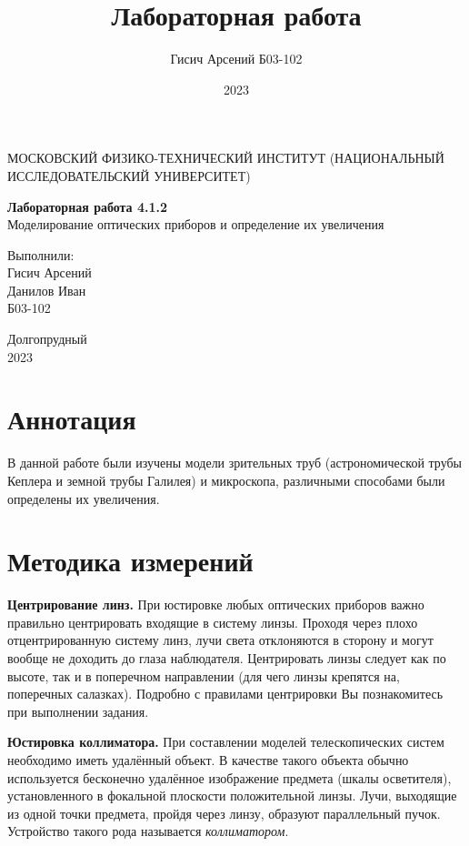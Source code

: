 \documentclass[a4paper, 12pt]{article}
\title{Лабораторная работа}
\author{Гисич Арсений Б03-102}
\date{2023}
\begin{document}
	\begin{center}
		{\large МОСКОВСКИЙ ФИЗИКО-ТЕХНИЧЕСКИЙ ИНСТИТУТ (НАЦИОНАЛЬНЫЙ ИССЛЕДОВАТЕЛЬСКИЙ УНИВЕРСИТЕТ)}
	\end{center}
	\vspace{5 cm}
	{\Large
		\begin{center}
			{\bf Лабораторная работа 4.1.2}\\[0.2 cm]
			Моделирование оптических приборов и определение их увеличения
		\end{center}
	}
	\vspace{4 cm}
	\begin{flushright}
		{\Large Выполнили: \\
			\vspace{0.2 cm}
			Гисич Арсений \\
			Данилов Иван \\
			\vspace{0.2 cm}
			Б03-102 \\}
	\end{flushright}
	\vspace{7 cm}
	\begin{center}
		Долгопрудный\\[0.1 cm]
		2023
	\end{center}
\thispagestyle{empty}

\section{Аннотация}

В данной работе были изучены модели зрительных труб (астрономической трубы Кеплера и земной трубы Галилея) и микроскопа, различными способами были определены их увеличения.

\section{Методика измерений}

\textbf{Центрирование линз.} При юстировке любых оптических приборов важно правильно центрировать входящие в систему линзы. Проходя через плохо
	отцентрированную систему линз, лучи света отклоняются в сторону и могут
	вообще не доходить до глаза наблюдателя. Центрировать линзы следует как
	по высоте, так и в поперечном направлении (для чего линзы крепятся на, поперечных салазках). Подробно с правилами центрировки Вы познакомитесь
	при выполнении задания.
	
\textbf{Юстировка коллиматора.} При составлении моделей телескопических
	систем необходимо иметь удалённый объект. В качестве такого объекта обычно используется бесконечно удалённое изображение предмета (шкалы осветителя), установленного в фокальной плоскости положительной линзы. Лучи,
	выходящие из одной точки предмета, пройдя через линзу, образуют параллельный пучок. Устройство такого рода называется \textit{коллиматором}.
\end{document}
